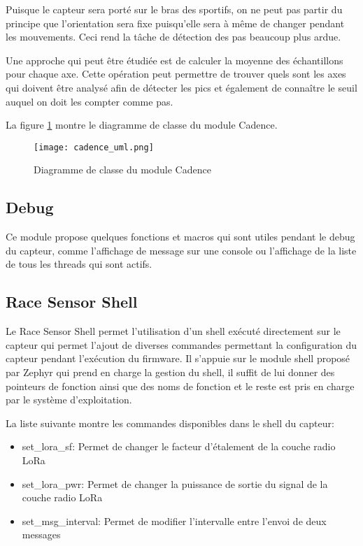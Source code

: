 Puisque le capteur sera porté sur le bras des sportifs, on ne peut pas partir du principe que l'orientation sera fixe puisqu'elle sera à même de changer pendant les mouvements. Ceci rend la tâche de détection des pas beaucoup plus ardue.

Une approche qui peut être étudiée est de calculer la moyenne des échantillons pour chaque axe. Cette opération peut permettre de trouver quels sont les axes qui doivent être analysé afin de détecter les pics et également de connaître le seuil auquel on doit les compter comme pas.

La figure \ref{fig:cadence_uml} montre le diagramme de classe du module Cadence.

\begin{figure}[htb]
\centering 
\texttt{[image: cadence\_uml.png]} 
\caption{Diagramme de classe du module Cadence}
\label{fig:cadence_uml}
\end{figure}

\subsection{Debug}

Ce module propose quelques fonctions et macros qui sont utiles pendant le debug du capteur, comme l'affichage de message sur une console ou l'affichage de la liste de tous les threads qui sont actifs.

\subsection{Race Sensor Shell}

Le Race Sensor Shell permet l'utilisation d'un shell exécuté directement sur le capteur qui permet l'ajout de diverses commandes permettant la configuration du capteur pendant l'exécution du firmware. Il s'appuie sur le module shell proposé par Zephyr qui prend en charge la gestion du shell, il suffit de lui donner des pointeurs de fonction ainsi que des noms de fonction et le reste est pris en charge par le système d'exploitation.

La liste suivante montre les commandes disponibles dans le shell du capteur:

\begin{itemize}
\item set\_lora\_sf: Permet de changer le facteur d'étalement de la couche radio LoRa
\item set\_lora\_pwr: Permet de changer la puissance de sortie du signal de la couche radio LoRa
\item set\_msg\_interval: Permet de modifier l'intervalle entre l'envoi de deux messages
\end{itemize}

